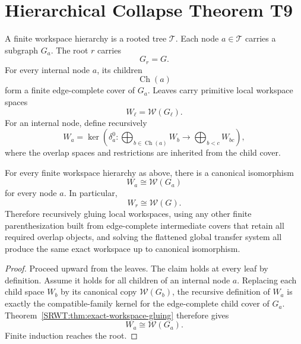 \section{Hierarchical Collapse Theorem T9}


A finite workspace hierarchy is a rooted tree \(\mathcal T\). Each node
\(a\in\mathcal T\) carries a subgraph \(G_a\). The root \(r\) carries
\[
G_r=G.
\]
For every internal node \(a\), its children
\[
\operatorname{Ch}(a)
\]
form a finite edge-complete cover of \(G_a\). Leaves carry primitive local
workspace spaces
\[
W_\ell=\mathscr W(G_\ell).
\]
For an internal node, define recursively
\[
\boxed{
W_a
=
\ker
\left(
\delta_a^0:
\bigoplus_{b\in\operatorname{Ch}(a)}W_b
\longrightarrow
\bigoplus_{b<c}W_{bc}
\right),
}
\]
where the overlap spaces and restrictions are inherited from the child cover.

\begin{SRWTtheorem}\label{SRWT:thm:hierarchical-collapse}
For every finite workspace hierarchy as above, there is a canonical
isomorphism
\[
\boxed{
W_a\cong\mathscr W(G_a)
}
\]
for every node \(a\). In particular,
\[
\boxed{
W_r\cong\mathscr W(G).
}
\]
Therefore recursively gluing local workspaces, using any other finite
parenthesization built from edge-complete intermediate covers that retain all
required overlap objects, and solving the flattened global transfer system all
produce the same exact workspace up to canonical isomorphism.
\end{SRWTtheorem}

\begin{proof}
Proceed upward from the leaves. The claim holds at every leaf by definition.
Assume it holds for all children of an internal node \(a\). Replacing each
child space \(W_b\) by its canonical copy \(\mathscr W(G_b)\), the recursive
definition of \(W_a\) is exactly the compatible-family kernel for the
edge-complete child cover of \(G_a\). Theorem~\ref{SRWT:thm:exact-workspace-gluing}
therefore gives
\[
W_a\cong\mathscr W(G_a).
\]
Finite induction reaches the root.
\end{proof}


